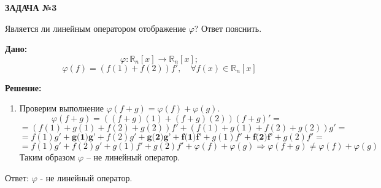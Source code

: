 \documentclass[a4paper]{article}
\begin{document}
	\begin{center}
		\textbf{ЗАДАЧА №3}
	\end{center}
	\par
		Является ли линейным оператором отображение $\varphi$? Ответ пояснить.
	\par
	\textbf{Дано:}\\
	$$\varphi:\mathbb{R}_{n}[x]\rightarrow\mathbb{R}_{n}[x];$$
	$$\varphi(f)=(f(1)+f(2))f',\quad\forall{f(x)} \in \mathbb{R}_{n}[x]$$
	\par
	\textbf{Решение:}
	\begin{enumerate}
		\item Проверим выполнение $\varphi(f+g)=\varphi(f)+\varphi(g)$.
		$$\varphi(f+g)=((f+g)(1)+(f+g)(2))(f+g)'=$$
		$$=(f(1)+g(1)+f(2)+g(2))f'+(f(1)+g(1)+f(2)+g(2))g'=$$
		$$=f(1)g'+\textbf{g(1)g'}+f(2)g'+\textbf{g(2)g'}+\textbf{f(1)f'}+g(1)f'+\textbf{f(2)f'}+g(2)f'=$$
		$$=f(1)g'+f(2)g'+g(1)f'+g(2)f'+\varphi(f)+\varphi(g) \Rightarrow \varphi(f+g)\not=\varphi(f)+\varphi(g)$$
		Таким образом $\varphi$ -- не линейный оператор.
	\end{enumerate}
	Ответ: $\varphi$ - не линейный оператор.
	
\end{document}

